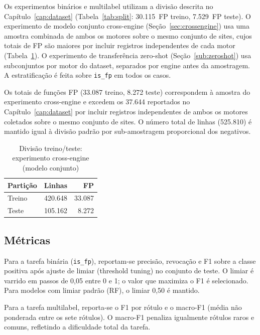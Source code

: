 Os experimentos binários e multilabel utilizam a divisão descrita no
Capítulo~\ref{cap:dataset} (Tabela~\ref{tab:split}: 30.115~FP treino, 7.529~FP
teste). O experimento de modelo conjunto cross-engine
(Seção~\ref{sec:crossengine}) usa uma amostra combinada de ambos os motores
sobre o mesmo conjunto de sites, cujos totais de FP são maiores por incluir
registros independentes de cada motor (Tabela~\ref{tab:split-exp}). O experimento
de transferência zero-shot (Seção~\ref{sub:zeroshot}) usa subconjuntos por motor
do dataset, separados por engine antes da amostragem. A estratificação é feita sobre \texttt{is\_fp} em todos os
casos.

\begin{table}[htb]
\centering
\caption{Divisão treino/teste: experimento cross-engine (modelo conjunto)}
\label{tab:split-exp}
{\footnotesize
Os totais de funções FP (33.087 treino, 8.272 teste) correspondem à amostra do
experimento cross-engine e excedem os 37.644 reportados no
Capítulo~\ref{cap:dataset} por incluir registros independentes de ambos os
motores coletados sobre o mesmo conjunto de sites. O número total de linhas
(525.810) é mantido igual à divisão padrão por sub-amostragem proporcional
dos negativos.
}

\bigskip
\begin{tabular}{lrr}
\toprule
\textbf{Partição} & \textbf{Linhas} & \textbf{FP} \\
\midrule
Treino & 420.648 & 33.087 \\
Teste  & 105.162 &  8.272 \\
\bottomrule
\end{tabular}

\end{table}

\subsection{Métricas}
\label{sub:exp-metricas}

Para a tarefa binária (\texttt{is\_fp}), reportam-se precisão, revocação e F1
sobre a classe positiva após ajuste de limiar (threshold tuning) no conjunto
de teste. O limiar é varrido em passos de 0,05 entre 0 e 1; o valor que maximiza o
F1 é selecionado. Para modelos com limiar padrão (RF), o limiar 0,50 é mantido.

Para a tarefa multilabel, reporta-se o F1 por rótulo e o macro-F1 (média não
ponderada entre os sete rótulos). O macro-F1 penaliza igualmente rótulos raros e
comuns, refletindo a dificuldade total da tarefa.

